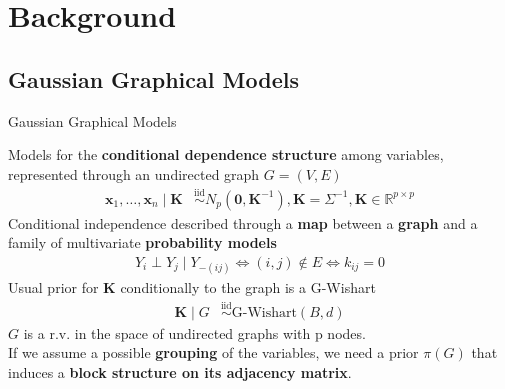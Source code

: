 

\section{Background}
\newcommand{\iid}{\overset{\mathrm{iid}}{\sim}}
\newcommand{\ind}{\overset{\mathrm{ind}}{\sim}}

\subsection{Gaussian Graphical Models}
\begin{frame}{Gaussian Graphical Models}

    Models for the \textbf{conditional dependence structure} among variables, represented through an undirected graph $G=(V,E)$
    \begin{align*}
    \bm{x}_{1}, \ldots, \bm{x}_{n} \mid \bm{K} &\iid N_{p}(\bm{0},\bm{K}^{-1}), \bm{K}=\Sigma^{-1}, \bm{K} \in \mathbb{R}^{p\times p}  %
    \end{align*}
Conditional independence described through a \textbf{map} between a \textbf{graph} and a family of multivariate \textbf{probability models}
\begin{align*}
Y_{i}\perp Y_{j} \mid Y_{-(ij)} \iff (i,j) \notin E \iff k_{ij}=0
\end{align*}
Usual prior for $\bm{K}$ conditionally to the graph is a G-Wishart
\begin{align*}
    \bm{K} \mid G &\iid \text{G-Wishart}(B,d)
\end{align*}
$G$ is a r.v. in the space of undirected graphs with p nodes.\\
If we assume a possible \textbf{grouping} of the variables, we need a prior $\pi(G)$ that induces a \textbf{block structure on its adjacency matrix}.
\end{frame}



 


